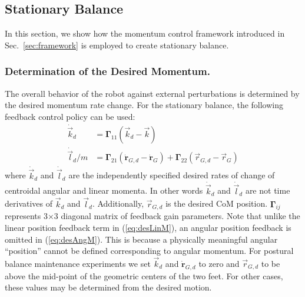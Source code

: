 \documentclass{llncs}
\newcommand{\vdr} {\boldsymbol{\dot{r}}}
\newcommand{\mGamma} {\boldsymbol{\Gamma}}
\newcommand{\vk}{\vec{k}}
\newcommand{\vr}{\vec{r}}
\newcommand{\vdk} {\dot{\vec{k}}}
\newcommand{\vl}{\vec{l}}
\newcommand{\vdl} {\dot{\vec{l}}}
\renewcommand{\section}[1]{\vspace{0.1in}\noindent{\large\bf{#1}}\par\vspace{.05in}\par\nopagebreak}
\begin{document}
\section{Scenarios}

\subsection{Stationary Balance}

In this section, we show how the momentum control framework introduced in Sec.~\ref{sec:framework} is employed to create stationary balance.

\subsubsection{Determination of the Desired Momentum.}
\label{sec:obj_bal_con}

The overall behavior of the robot against external perturbations
is determined by the desired momentum rate change.
For the stationary balance, the following feedback control policy can be used:
\begin{align}
	\vdk_d &= \mGamma_{11} (\vk_d - \vk) \label{eq:desAngM}\\
	\vdl_d/m &= \mGamma_{21}(\vdr_{G,d}-\vdr_G) + \mGamma_{22}(\vr_{G,d}-\vr_G) \label{eq:desLinM}
\end{align}
where $\vdk_d$ and $\vdl_d$ are the independently specified
desired rates of change of centroidal angular and
linear momenta. In other words $\vdk_d$ and $\vdl_d$ are not time derivatives of $\vk_d$ and $\vl_d$.
Additionally, $\vr_{G,d}$ is the desired CoM position.
$\mGamma_{ij}$ represents 3$\times$3 diagonal matrix of feedback gain parameters.
Note that unlike the linear position feedback term in (\ref{eq:desLinM}), an angular position
feedback is omitted in (\ref{eq:desAngM}). This is because a physically meaningful angular
``position''
cannot be defined corresponding to angular momentum\cite{Wie05}.
For postural balance maintenance experiments we set $\vk_d$ and $\vdr_{G,d}$ to zero
and $\vr_{G,d}$ to be above the mid-point of the geometric centers of the
two feet. For other cases, these values may be determined from the desired motion.
\end{document}
